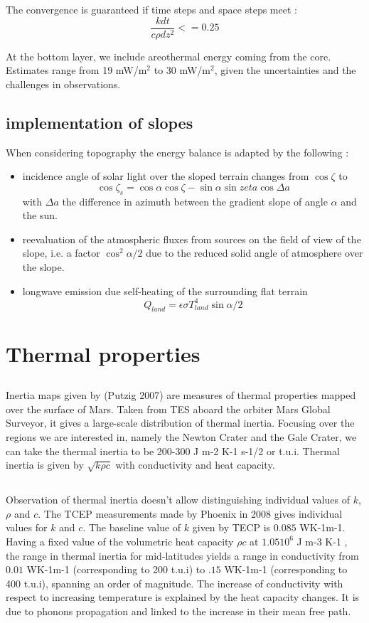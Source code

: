 \documentclass{report}
\begin{document}
The convergence is guaranteed if time steps and space steps meet : \[\frac{k dt}{c\rho dz^2}<=0.25\] 

At the bottom layer, we include areothermal energy coming from the core. Estimates range from 19 mW/m$^2$ to 30 mW/m$^2$, given the uncertainties and the challenges in observations.

    \subsection{implementation of slopes}
    When considering topography the energy balance is adapted by the following :
    \begin{itemize}
        \item incidence angle of solar light over the sloped terrain changes from $\cos{\zeta} $ to $$\cos{ \zeta_s} = \cos{ \alpha} \cos{ \zeta} - \sin{ \alpha} \sin{zeta}\cos{\Delta a}$$
        with $\Delta a$ the difference in azimuth between the gradient slope of angle $\alpha$ and the sun. 
        \item reevaluation of the atmospheric fluxes from sources on the field of view of the slope, i.e. a factor $\cos^2{\alpha/2}$ due to the reduced solid angle of atmosphere over the slope.  
        \item longwave emission due self-heating of the surrounding flat terrain 
       \[Q_{land} = \epsilon \sigma T_{land}^4\sin{\alpha/2}\]
    \end{itemize}{}

\section{Thermal properties}
    \subsection{}
    Inertia maps given by (Putzig 2007) are measures of thermal properties mapped over the surface of Mars. Taken from TES aboard the orbiter Mars Global Surveyor, it gives a large-scale distribution of thermal inertia. 
    Focusing over the regions we are interested in, namely the Newton Crater and the Gale Crater, we can take the thermal inertia to be 200-300 J m-2 K-1 s-1/2 or t.u.i. 
    Thermal inertia is given by $\sqrt{k\rho c}$ with conductivity and heat capacity. 
    \subsection{}
    Observation of thermal inertia doesn't allow distinguishing individual values of $k$, $\rho$ and $c$. The TCEP measurements made by Phoenix in 2008 gives individual values for $k$ and $c$. 
    The baseline value of $k$ given by TECP is $0.085$ WK-1m-1. 
    Having a fixed value of the volumetric heat capacity $\rho c$ at $1.05 10^6$ J m-3 K-1 , the range in thermal inertia for mid-latitudes yields a range in conductivity from $0.01$ WK-1m-1 (corresponding to 200 t.u.i) to $.15$ WK-1m-1 (corresponding to 400 t.u.i), spanning an order of magnitude.
    The increase of conductivity with respect to increasing temperature is explained by the heat capacity changes. It is due to phonons propagation and linked to the increase in their mean free path. 
    
\end{document}
